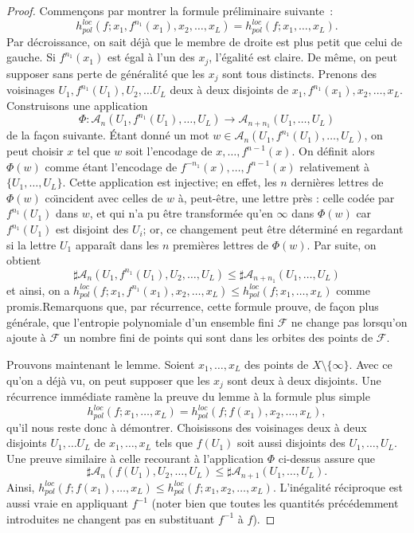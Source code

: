 \documentclass[11pt]{article}
\theoremstyle{definition}
\numberwithin{equation}{section}
\numberwithin{figure}{section}
\numberwithin{table}{section}
\newcommand*\cA{{\mathcal A}}
\newcommand*\cF{{\mathcal F}}
\begin{document}
\begin{proof}
Commençons par montrer la formule préliminaire suivante~:
\[
h^{loc}_{pol}(f;x_1, f^{n_1}(x_{1}), x_2, \dots, x_{L}) = h^{loc}_{pol}(f;x_{1}, \dots, x_{L}).
\]
Par décroissance, on sait déjà que le membre de droite est plus petit que celui de gauche. Si $f^{n_1}(x_1)$ est égal à l'un des $x_j$, l'égalité est claire. De même, on peut supposer sans perte de généralité que les $x_j$ sont tous distincts. Prenons des voisinages $U_1, f^{n_1}(U_1), U_2, \dots U_L$ deux à deux disjoints de $x_1, f^{n_1}(x_{1}), x_2, \dots, x_{L}$. Construisons une application
\[
\Phi: \cA_{n}(U_1, f^{n_1}(U_1), \dots, U_L) \to \cA_{n+n_1}(U_1, \dots, U_L)
\]
de la façon suivante. \'Etant donné un mot $w \in \cA_{n}(U_1, f^{n_1}(U_1), \dots, U_L)$, on peut choisir $x$ tel que $w$ soit l'encodage de $x, \dots, f^{n-1}(x)$. On définit alors $\Phi(w)$ comme étant l'encodage de $f^{-n_1}(x), \dots, f^{n-1}(x)$ relativement à $\{U_1, \dots, U_L\}$. Cette application est injective; en effet, les $n$ dernières lettres de $\Phi(w)$ co\"{\i}ncident avec celles de $w$ à, peut-être, une lettre près : celle codée par $f^{n_1}(U_1)$ dans $w$, et qui {n'a pu être transformée qu'en $\infty$ dans $\Phi(w)$ car $f^{n_1}(U_1)$ est disjoint des $U_i$}; or, ce changement peut être déterminé en regardant si la lettre $U_1$ apparaît dans les $n$ premières lettres de $\Phi(w)$. Par suite, on obtient
\[
\sharp \cA_{n}(U_1, f^{n_1}(U_1), U_2, \dots, U_L) \leq \sharp \cA_{n+n_1}(U_1, \dots, U_L)
\]
et ainsi, on a $h^{loc}_{pol}(f;x_1, f^{n_1}(x_{1}), x_2, \dots, x_{L}) \leq h^{loc}_{pol}(f;x_{1}, \dots, x_{L})$ comme promis.\linebreak Remarquons que, par récurrence, cette formule prouve, de façon plus générale, que l'entropie polynomiale d'un ensemble fini $\cF$ ne change pas lorsqu'on ajoute à $\cF$ un nombre fini de points qui sont dans les orbites des points de $\cF$.

Prouvons maintenant le lemme. Soient $x_1, \dots, x_L$ des points de $X \setminus \{\infty\}$. Avec ce qu'on a déjà vu, on peut supposer que les $x_j$ sont deux à deux disjoints. Une récurrence immédiate ramène la preuve du lemme à la formule plus simple
\[
h^{loc}_{pol}(f;x_{1}, \dots, x_{L})=h^{loc}_{pol}(f;f(x_{1}), x_2, \dots, x_{L}),
\]
{qu'il nous reste donc à démontrer}. Choisissons des voisinages deux à deux disjoints $U_1, \dots U_L$ de $x_1, \dots, x_{L}$ tels que $f(U_1)$ soit aussi disjoints des $U_1, \dots, U_L$. Une preuve similaire à celle recourant
à l'application $\Phi$ ci-dessus assure que
\[
\sharp \cA_{n}(f(U_1), U_2, \dots, U_L) \leq \sharp \cA_{n+1}(U_1, \dots, U_L).
\]
Ainsi, $h^{loc}_{pol}(f;f(x_{1}), \dots, x_{L}) \leq h^{loc}_{pol}(f;x_{1}, x_2, \dots, x_{L})$. L'inégalité réciproque est aussi vraie en appliquant $f^{-1}$ (noter bien que toutes les quantités précédemment introduites ne changent pas en substituant $f^{-1}$ à $f$).
\end{proof}
\end{document}
